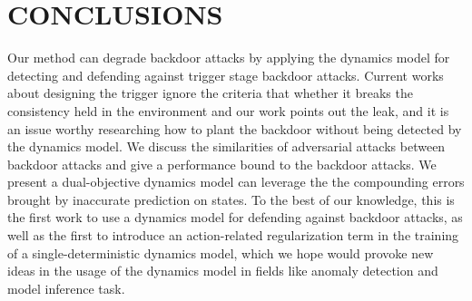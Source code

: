 \documentclass[letterpaper, 10 pt, conference]{ieeeconf}  %
\begin{document}
\section{CONCLUSIONS}
Our method can degrade backdoor attacks by applying the dynamics model for detecting and defending against trigger stage backdoor attacks. Current works about designing the trigger ignore the criteria that whether it breaks the consistency held in the environment and our work points out the leak, and it is an issue worthy researching how to plant the backdoor without being detected by the dynamics model. We discuss the similarities of adversarial attacks between backdoor attacks and give a performance bound to the backdoor attacks. We present a dual-objective dynamics model can leverage the the compounding errors brought by inaccurate prediction on states. To the best of our knowledge, this is the first work to use a dynamics model for defending against backdoor attacks, as well as the first to introduce an action-related regularization term in the training of a single-deterministic dynamics model, which we hope would provoke new ideas in the usage of the dynamics model in fields like anomaly detection and model inference task. 






\end{document}
